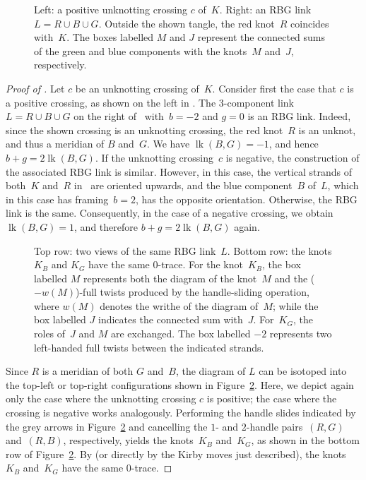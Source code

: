 \documentclass{amsart}
\theoremstyle{remark}
\DeclareMathOperator{\lk}{lk}
\begin{document}
    \begin{figure}[t]
	   \centering
	   \def\svgwidth{0.8\columnwidth}
	   
       \caption{Left: a positive unknotting crossing $c$ of~$K$. Right: an RBG link~$L = R \cup B \cup G$. Outside the shown tangle, the red knot~$R$ coincides with~$K$. The boxes labelled $M$ and $J$
       represent the connected sums of the green and blue  
       components with the knots~$M$ and~$J$, respectively.
       }
	   \label{fig:RBG}
    \end{figure}

\begin{proof}[{Proof of }]
    Let $c$ be an unknotting crossing of~$K$. Consider first the case that $c$ is a positive crossing, as shown on the left in . The $3$-component link $L = R \cup B \cup G$ on the right of~ with~$b=-2$ and $g=0$ is an RBG link. Indeed, since the shown crossing is an unknotting crossing, the red knot~$R$ is an unknot, and thus a meridian of $B$ and~$G$. 
    We have $\lk(B,G) = -1$, and hence~$b+g = 2\lk(B,G)$.
    If the unknotting crossing~$c$ is negative, the construction of the associated RBG link is similar. However, in this case, the vertical strands of both~$K$ and~$R$ in~ are oriented upwards, and the blue component~$B$ of~$L$, which in this case has framing~$b=2$, has the opposite orientation. Otherwise, the RBG link is the same. Consequently, in the case of a negative crossing, 
    we obtain~$\lk(B,G)=1$, and therefore $b+g = 2\lk(B,G)$ again.

        \begin{figure}[t]
    \centering
    \tiny   
    \def\svgwidth{1\columnwidth}  
    
    \caption{Top row: two views of the same RBG link~$L$. Bottom row: the knots $K_B$ and $K_G$ have the same $0$-trace. For the knot~$K_B$, the box labelled $M$ represents both the diagram of the knot~$M$ and the ($-w(M)$)-full twists produced by the handle-sliding operation, where $w(M)$ denotes the writhe of the diagram of~$M$; while the box labelled $J$ indicates the connected sum with~$J$. For~$K_G$, the roles of~$J$ and $M$ are exchanged. The box labelled $-2$ represents two left-handed full twists between the indicated strands.}
    \label{fig:main_figure}
\end{figure}

    
    Since $R$ is a meridian of both $G$ and~$B$, the diagram of $L$ can be isotoped into the top-left or top-right configurations shown in Figure~\ref{fig:main_figure}. Here, we depict
    again only the case where the unknotting crossing $c$ is positive; the case where the crossing is negative works analogously.
    Performing the handle slides indicated by the grey arrows in Figure~\ref{fig:main_figure} and cancelling the $1$- and $2$-handle pairs~$(R, G)$ and~$(R, B)$, respectively, yields the knots~$K_B$ and~$K_G$, as shown in the bottom row of Figure~\ref{fig:main_figure}. By  (or directly by the Kirby moves just described), the knots~$K_B$ and~$K_G$ have the same $0$-trace.


\end{proof}
\end{document}
